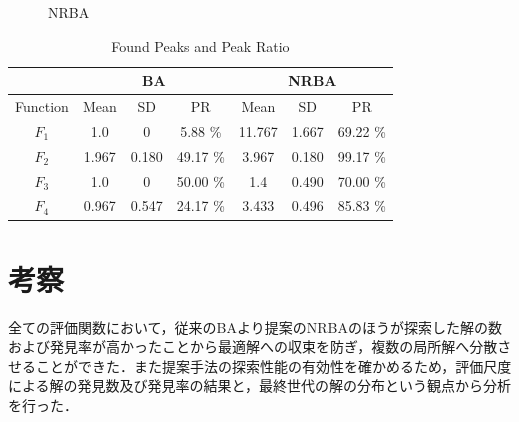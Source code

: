 \documentclass{jarticle}
\begin{document}
\begin{figure}[pb]
{\label{fig:f3_nrba}}

\caption{NRBA}
\label{fig:results_nrba}
\end{figure}

\begin{table}[t]
\caption{Found Peaks and Peak Ratio}
\begin{center}
\begin{tabular}{c|c|c|c|c|c|c}
\hline
\multicolumn{1}{c|}{} & \multicolumn{3}{c|}{BA} & \multicolumn{3}{c}{NRBA}  \\
\hline
Function & Mean & SD & PR & Mean & SD & PR \\
\hline
$F_1$ & 1.0 & 0 & 5.88 \% & 11.767 & 1.667 & 69.22 \% \\
\hline
$F_2$ & 1.967 & 0.180 & 49.17 \% & 3.967 & 0.180 & 99.17 \% \\
\hline
$F_3$ & 1.0 & 0 & 50.00 \% & 1.4 & 0.490 & 70.00 \% \\
\hline
$F_4$ & 0.967 & 0.547 & 24.17 \% & 3.433 & 0.496 & 85.83 \% \\
\hline
\end{tabular}
\label{tab2}
\end{center}
\end{table}
\section{考察}
全ての評価関数において，従来のBAより提案のNRBAのほうが探索した解の数および発見率が高かったことから最適解への収束を防ぎ，複数の局所解へ分散させることができた．また提案手法の探索性能の有効性を確かめるため，評価尺度による解の発見数及び発見率の結果と，最終世代の解の分布という観点から分析を行った．
\end{document}
